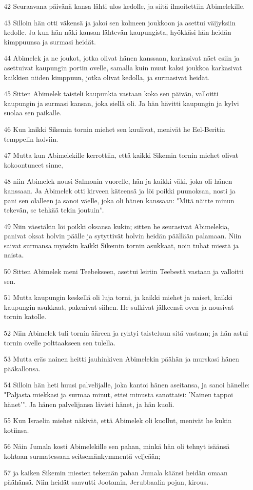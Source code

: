 \par 42 Seuraavana päivänä kansa lähti ulos kedolle, ja siitä ilmoitettiin Abimelekille.
\par 43 Silloin hän otti väkensä ja jakoi sen kolmeen joukkoon ja asettui väijyksiin kedolle. Ja kun hän näki kansan lähtevän kaupungista, hyökkäsi hän heidän kimppuunsa ja surmasi heidät.
\par 44 Abimelek ja ne joukot, jotka olivat hänen kanssaan, karkasivat näet esiin ja asettuivat kaupungin portin ovelle, samalla kuin muut kaksi joukkoa karkasivat kaikkien niiden kimppuun, jotka olivat kedolla, ja surmasivat heidät.
\par 45 Sitten Abimelek taisteli kaupunkia vastaan koko sen päivän, valloitti kaupungin ja surmasi kansan, joka siellä oli. Ja hän hävitti kaupungin ja kylvi suolaa sen paikalle.
\par 46 Kun kaikki Sikemin tornin miehet sen kuulivat, menivät he Eel-Beritin temppelin holviin.
\par 47 Mutta kun Abimelekille kerrottiin, että kaikki Sikemin tornin miehet olivat kokoontuneet sinne,
\par 48 niin Abimelek nousi Salmonin vuorelle, hän ja kaikki väki, joka oli hänen kanssaan. Ja Abimelek otti kirveen käteensä ja löi poikki puunoksan, nosti ja pani sen olalleen ja sanoi väelle, joka oli hänen kanssaan: "Mitä näitte minun tekevän, se tehkää tekin joutuin".
\par 49 Niin väestäkin löi poikki oksansa kukin; sitten he seurasivat Abimelekia, panivat oksat holvin päälle ja sytyttivät holvin heidän päällään palamaan. Niin saivat surmansa myöskin kaikki Sikemin tornin asukkaat, noin tuhat miestä ja naista.
\par 50 Sitten Abimelek meni Teebekseen, asettui leiriin Teebestä vastaan ja valloitti sen.
\par 51 Mutta kaupungin keskellä oli luja torni, ja kaikki miehet ja naiset, kaikki kaupungin asukkaat, pakenivat siihen. He sulkivat jälkeensä oven ja nousivat tornin katolle.
\par 52 Niin Abimelek tuli tornin ääreen ja ryhtyi taisteluun sitä vastaan; ja hän astui tornin ovelle polttaakseen sen tulella.
\par 53 Mutta eräs nainen heitti jauhinkiven Abimelekin päähän ja murskasi hänen pääkallonsa.
\par 54 Silloin hän heti huusi palvelijalle, joka kantoi hänen aseitansa, ja sanoi hänelle: "Paljasta miekkasi ja surmaa minut, ettei minusta sanottaisi: 'Nainen tappoi hänet'". Ja hänen palvelijansa lävisti hänet, ja hän kuoli.
\par 55 Kun Israelin miehet näkivät, että Abimelek oli kuollut, menivät he kukin kotiinsa.
\par 56 Näin Jumala kosti Abimelekille sen pahan, minkä hän oli tehnyt isäänsä kohtaan surmatessaan seitsemänkymmentä veljeään;
\par 57 ja kaiken Sikemin miesten tekemän pahan Jumala käänsi heidän omaan päähänsä. Niin heidät saavutti Jootamin, Jerubbaalin pojan, kirous.

